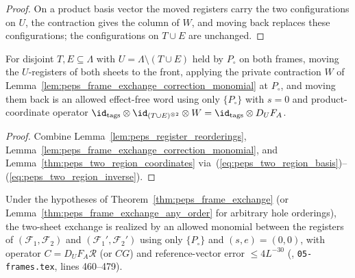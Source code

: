 \begin{proof}\leanok
    On a product basis vector the moved registers carry the two configurations on
    $U$, the contraction gives the column of $W$, and moving back replaces these
    configurations; the configurations on $T\cup E$ are unchanged.
\end{proof}

\begin{lemma}
    \label{lem:peps_exchange_correction_word}
    \leanok
    For disjoint $T,E\subseteq\Lambda$ with $U=\Lambda\setminus(T\cup E)$ held
    by $P_\circ$ on both frames, moving the $U$-registers of both sheets to the
    front, applying the private contraction $W$ of
    Lemma~\ref{lem:peps_frame_exchange_correction_monomial} at $P_\circ$, and
    moving them back is an allowed effect-free word using only $\{P_\circ\}$
    with $s=0$ and product-coordinate operator
    $\id_{\rm tags}\otimes\id_{(T\cup E)^{\otimes 2}}\otimes W=\id_{\rm tags}\otimes D_UF_A$.
\end{lemma}

\begin{proof}\leanok
    Combine Lemma~\ref{lem:peps_register_reorderings},
    Lemma~\ref{lem:peps_frame_exchange_correction_monomial}, and
    Lemma~\ref{thm:peps_two_region_coordinates}
    via~(\ref{eq:peps_two_region_basis})--(\ref{eq:peps_two_region_inverse}).
\end{proof}

\begin{corollary}
    \label{thm:peps_frame_exchange_bounded}
    \leanok
    Under the hypotheses of Theorem~\ref{thm:peps_frame_exchange} (or
    Lemma~\ref{thm:peps_frame_exchange_any_order} for arbitrary hole
    orderings), the two-sheet exchange is realized by an allowed monomial
    between the registers of $(\mathcal F_1,\mathcal F_2)$ and
    $(\mathcal F_1',\mathcal F_2')$ using only $\{P_\circ\}$ and $(s,e)=(0,0)$,
    with operator $C=D_UF_A\mathcal R$ (or $CG$) and reference-vector error
    $\le 4L^{-30}$ (\cite[Lemma~6.6 and Theorem~5.2]{OpenAI2026PolynomialPEPS},
    \texttt{05-frames.tex}, lines 460--479).
\end{corollary}

